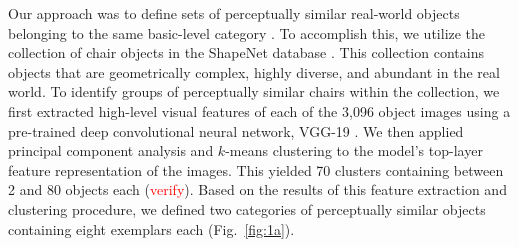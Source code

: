 \documentclass[10pt,letterpaper]{article}
\newcommand{\red}[1]{\textcolor{Red}{#1}}
\begin{document}
Our approach was to define sets of perceptually similar real-world objects belonging to the same basic-level category \cite{MervisRosch81_CategorizationReview}.
To accomplish this, we utilize the collection of chair objects in the ShapeNet database \cite{chang2015shapenet}.
This collection contains objects that are geometrically complex, highly diverse, and abundant in the real world.
To identify groups of perceptually similar chairs within the collection, we first extracted high-level visual features of each of the 3,096 object images using a pre-trained deep convolutional neural network, VGG-19 \cite{simonyan2014very}. 
We then applied principal component analysis and $k$-means clustering to the model's top-layer feature representation of the images. 
This yielded 70 clusters containing between 2 and 80 objects each (\red{verify}).
Based on the results of this feature extraction and clustering procedure, we defined two categories of perceptually similar objects containing eight exemplars each (Fig.~\ref{fig:1a}). 


\end{document}
